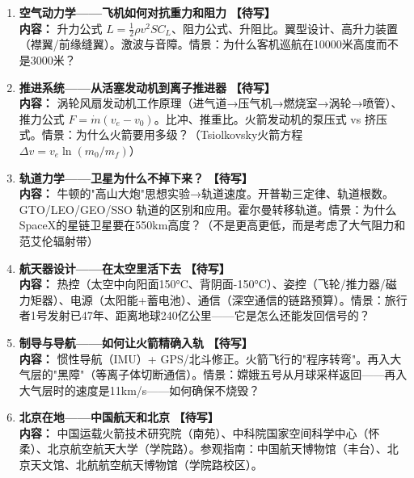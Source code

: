 \documentclass[a4paper,11pt]{ctexart}
\newcommand{\draft}{\textcolor{orange!80!black}{\textbf{【待写】}}}
\begin{document}
\begin{enumerate}
\item[\textbf{第1课}] \textbf{空气动力学——飞机如何对抗重力和阻力} \draft \\
\textbf{内容：} 升力公式 $L = \frac12\rho v^2 S C_L$、阻力公式、升阻比。翼型设计、高升力装置（襟翼/前缘缝翼）。激波与音障。情景：为什么客机巡航在10000米高度而不是3000米？
\item[\textbf{第2课}] \textbf{推进系统——从活塞发动机到离子推进器} \draft \\
\textbf{内容：} 涡轮风扇发动机工作原理（进气道→压气机→燃烧室→涡轮→喷管）、推力公式 $F = \dot{m}(v_e - v_0)$。比冲、推重比。火箭发动机的泵压式 vs 挤压式。情景：为什么火箭要用多级？（Tsiolkovsky火箭方程$\Delta v = v_e \ln(m_0/m_f)$）
\item[\textbf{第3课}] \textbf{轨道力学——卫星为什么不掉下来？} \draft \\
\textbf{内容：} 牛顿的"高山大炮"思想实验→轨道速度。开普勒三定律、轨道根数。GTO/LEO/GEO/SSO 轨道的区别和应用。霍尔曼转移轨道。情景：为什么SpaceX的星链卫星要在550km高度？（不是更高更低，而是考虑了大气阻力和范艾伦辐射带）
\item[\textbf{第4课}] \textbf{航天器设计——在太空里活下去} \draft \\
\textbf{内容：} 热控（太空中向阳面150°C、背阴面-150°C）、姿控（飞轮/推力器/磁力矩器）、电源（太阳能+蓄电池）、通信（深空通信的链路预算）。情景：旅行者1号发射已47年、距离地球240亿公里——它是怎么还能发回信号的？
\item[\textbf{第5课}] \textbf{制导与导航——如何让火箭精确入轨} \draft \\
\textbf{内容：} 惯性导航（IMU）+ GPS/北斗修正。火箭飞行的"程序转弯"。再入大气层的"黑障"（等离子体切断通信）。情景：嫦娥五号从月球采样返回——再入大气层时的速度是11km/s——如何确保不烧毁？
\item[\textbf{第6课}] \textbf{北京在地——中国航天和北京} \draft \\
\textbf{内容：} 中国运载火箭技术研究院（南苑）、中科院国家空间科学中心（怀柔）、北京航空航天大学（学院路）。参观指南：中国航天博物馆（丰台）、北京天文馆、北航航空航天博物馆（学院路校区）。
\end{enumerate}
\end{document}
